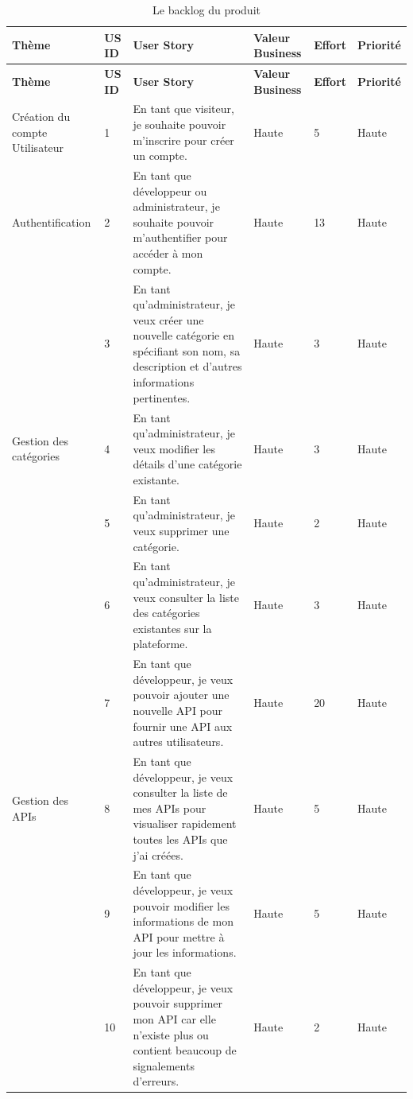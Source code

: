 \begin{landscape}
\begin{longtable}[c]{
    |p{}
    |p{}
    |p{}
    |p{}
    |p{}
    |p{}|
    }
    \caption{Le backlog du produit}
    \label{tab} \\
    \hline
    \textbf{Thème} &  \textbf{US ID} & \textbf{User Story} & \textbf{Valeur Business} & \textbf{Effort} & \textbf{Priorité} \\
    \hline
    \endfirsthead   
    \hline
    \textbf{Thème} &  \textbf{US ID} & \textbf{User Story} & \textbf{Valeur Business} & \textbf{Effort} & \textbf{Priorité} \\
    \hline
    \endhead
    \hline
    \endfoot
    \hline
    \endlastfoot
Création du compte Utilisateur & 1 & En tant que visiteur, je souhaite pouvoir m'inscrire pour créer un compte. & Haute & 5 & Haute \\
\hline
Authentification & 2 & En tant que développeur ou administrateur, je souhaite pouvoir m'authentifier pour accéder à mon compte. & Haute & 13 & Haute \\
\hline
 & 3 & En tant qu'administrateur, je veux créer une nouvelle catégorie en spécifiant son nom, sa description et d'autres informations pertinentes. & Haute & 3 & Haute \\
\cline{2-2} \cline{3-6}

Gestion des catégories & 4 & En tant qu'administrateur, je veux modifier les détails d'une catégorie existante. & Haute & 3 & Haute \\
\cline{2-2} \cline{3-6}

 & 5 & En tant qu'administrateur, je veux supprimer une catégorie. & Haute & 2 & Haute \\
\cline{2-2} \cline{3-6}

 & 6 & En tant qu'administrateur, je veux consulter la liste des catégories existantes sur la plateforme. & Haute & 3 & Haute \\
\hline
 & 7 & En tant que développeur, je veux pouvoir ajouter une nouvelle API pour fournir une API aux autres utilisateurs. & Haute & 20 & Haute \\
\cline{2-2} \cline{3-6}
Gestion des APIs & 8 & En tant que développeur, je veux consulter la liste de mes APIs pour visualiser rapidement toutes les APIs que j'ai créées. & Haute & 5 & Haute \\
\cline{2-2} \cline{3-6}
 & 9 & En tant que développeur, je veux pouvoir modifier les informations de mon API pour mettre à jour les informations. & Haute & 5 & Haute \\
\cline{2-2} \cline{3-6}
 & 10 & En tant que développeur, je veux pouvoir supprimer mon API car elle n'existe plus ou contient beaucoup de signalements d'erreurs. & Haute & 2 & Haute \\
\hline


\end{longtable}
\end{landscape}
